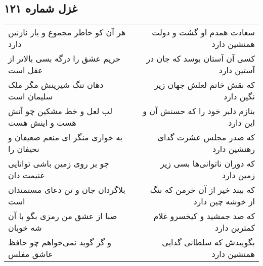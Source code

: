 \begin{center}
\section*{غزل شماره ۱۲۱}
\label{sec:sh121}
\begin{longtable}{l p{0.5cm} r}
هر آن کو خاطر مجموع و یار نازنین دارد
&&
سعادت همدم او گشت و دولت همنشین دارد
\\
حریم عشق را درگه بسی بالاتر از عقل است
&&
کسی آن آستان بوسد که جان در آستین دارد
\\
دهان تنگ شیرینش مگر ملک سلیمان است
&&
که نقش خاتم لعلش جهان زیر نگین دارد
\\
لب لعل و خط مشکین چو آنش هست و اینش هست
&&
بنازم دلبر خود را که حسنش آن و این دارد
\\
به خواری منگر ای منعم ضعیفان و نحیفان را
&&
که صدر مجلس عشرت گدای رهنشین دارد
\\
چو بر روی زمین باشی توانایی غنیمت دان
&&
که دوران ناتوانی‌ها بسی زیر زمین دارد
\\
بلاگردان جان و تن دعای مستمندان است
&&
که بیند خیر از آن خرمن که ننگ از خوشه چین دارد
\\
صبا از عشق من رمزی بگو با آن شه خوبان
&&
که صد جمشید و کیخسرو غلام کمترین دارد
\\
و گر گوید نمی‌خواهم چو حافظ عاشق مفلس
&&
بگوییدش که سلطانی گدایی همنشین دارد
\\
\end{longtable}
\end{center}
